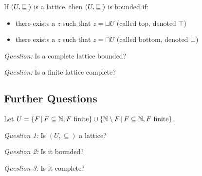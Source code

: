 \begin{definition}
  If $(U, \sqsubseteq{})$ is a lattice, then $(U, \sqsubseteq{})$ is bounded if:
  \begin{itemize}
  \item there exists a $z$ such that $z = \sqcup U$ (called top, denoted $\top$)
  \item there exists a $z$ such that $z = \sqcap U$ (called bottom, denoted $\bot$)
  \end{itemize}
\end{definition}

\emph{Question:} Is a complete lattice bounded?

\emph{Question:} Is a finite lattice complete?

\subsection{Further Questions}
Let $U = \left\{F \,\middle|\, F \subseteq \mathbb{N}, F \text{ finite}\right\} \cup \left\{\mathbb{N} \setminus F \,\middle|\, F \subseteq \mathbb{N}, F \text{ finite}\right\}$.

\emph{Question 1:} Is $(U, \subseteq)$ a lattice?

\emph{Question 2:} Is it bounded?

\emph{Question 3:} Is it complete?

